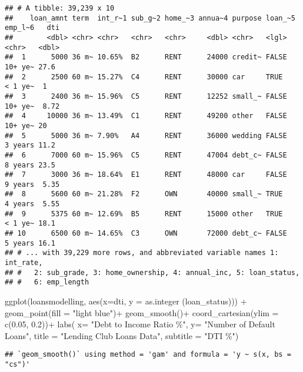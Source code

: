 \documentclass[
]{article}
\newenvironment{Shaded}{\begin{snugshade}}{\end{snugshade}}
\newcommand{\AttributeTok}[1]{\textcolor[rgb]{0.77,0.63,0.00}{#1}}
\newcommand{\FloatTok}[1]{\textcolor[rgb]{0.00,0.00,0.81}{#1}}
\newcommand{\FunctionTok}[1]{\textcolor[rgb]{0.00,0.00,0.00}{#1}}
\newcommand{\NormalTok}[1]{#1}
\newcommand{\SpecialCharTok}[1]{\textcolor[rgb]{0.00,0.00,0.00}{#1}}
\newcommand{\StringTok}[1]{\textcolor[rgb]{0.31,0.60,0.02}{#1}}
\begin{document}
\begin{verbatim}
## # A tibble: 39,239 x 10
##    loan_amnt term  int_r~1 sub_g~2 home_~3 annua~4 purpose loan_~5 emp_l~6   dti
##        <dbl> <chr> <chr>   <chr>   <chr>     <dbl> <chr>   <lgl>   <chr>   <dbl>
##  1      5000 36 m~ 10.65%  B2      RENT      24000 credit~ FALSE   10+ ye~ 27.6 
##  2      2500 60 m~ 15.27%  C4      RENT      30000 car     TRUE    < 1 ye~  1   
##  3      2400 36 m~ 15.96%  C5      RENT      12252 small_~ FALSE   10+ ye~  8.72
##  4     10000 36 m~ 13.49%  C1      RENT      49200 other   FALSE   10+ ye~ 20   
##  5      5000 36 m~ 7.90%   A4      RENT      36000 wedding FALSE   3 years 11.2 
##  6      7000 60 m~ 15.96%  C5      RENT      47004 debt_c~ FALSE   8 years 23.5 
##  7      3000 36 m~ 18.64%  E1      RENT      48000 car     FALSE   9 years  5.35
##  8      5600 60 m~ 21.28%  F2      OWN       40000 small_~ TRUE    4 years  5.55
##  9      5375 60 m~ 12.69%  B5      RENT      15000 other   TRUE    < 1 ye~ 18.1 
## 10      6500 60 m~ 14.65%  C3      OWN       72000 debt_c~ FALSE   5 years 16.1 
## # ... with 39,229 more rows, and abbreviated variable names 1: int_rate,
## #   2: sub_grade, 3: home_ownership, 4: annual_inc, 5: loan_status,
## #   6: emp_length
\end{verbatim}

\begin{Shaded}
\begin{Highlighting}[]
\FunctionTok{ggplot}\NormalTok{(loansmodelling,}
       \FunctionTok{aes}\NormalTok{(}\AttributeTok{x=}\NormalTok{dti, }\AttributeTok{y =} \FunctionTok{as.integer}\NormalTok{ (loan\_status))) }\SpecialCharTok{+}
  \FunctionTok{geom\_point}\NormalTok{(}\AttributeTok{fill =} \StringTok{"light blue"}\NormalTok{)}\SpecialCharTok{+}
  \FunctionTok{geom\_smooth}\NormalTok{()}\SpecialCharTok{+}
  \FunctionTok{coord\_cartesian}\NormalTok{(}\AttributeTok{ylim =} \FunctionTok{c}\NormalTok{(}\FloatTok{0.05}\NormalTok{, }\FloatTok{0.2}\NormalTok{))}\SpecialCharTok{+}
   \FunctionTok{labs}\NormalTok{( }\AttributeTok{x=} \StringTok{"Debt to Income Ratio \%"}\NormalTok{,}
        \AttributeTok{y=} \StringTok{"Number of Default Loans"}\NormalTok{,}
        \AttributeTok{title =} \StringTok{"Lending Club Loans Data"}\NormalTok{,}
        \AttributeTok{subtitle =} \StringTok{"DTI \%"}\NormalTok{)}
\end{Highlighting}
\end{Shaded}

\begin{verbatim}
## `geom_smooth()` using method = 'gam' and formula = 'y ~ s(x, bs = "cs")'
\end{verbatim}
\end{document}
